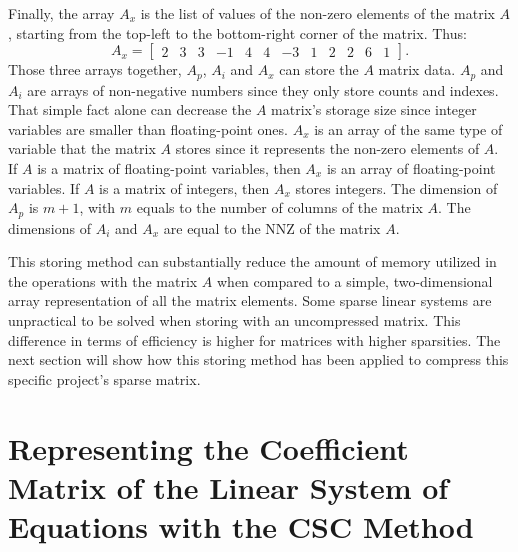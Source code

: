 Finally, the array $A_x$ is the list of values of the non-zero elements of the matrix $A$, starting from the top-left to the bottom-right corner of the matrix. Thus: 
	\begin{equation}
	A_x = 
	\begin{bmatrix}
	2	&3	&3	&-1	&4	&4	&-3	&1	&2	&2	&6	&1
	\end{bmatrix}
	.
	\end{equation}
%
Those three arrays together, $A_p$, $A_i$ and $A_x$ can store the $A$ matrix data. 
%
$A_p$ and $A_i$ are arrays of non-negative numbers since they only store counts and indexes. 
%
That simple fact alone can decrease the $A$ matrix's storage size since integer variables are smaller than floating-point ones. 
%
$A_x$ is an array of the same type of variable that the matrix $A$ stores since it represents the non-zero elements of $A$. 
%
If $A$ is a matrix of floating-point variables, then $A_x$ is an array of floating-point variables. 
%
If $A$ is a matrix of integers, then $A_x$ stores integers. 
%
The dimension of $A_p$ is $m+1$, with $m$ equals to the number of columns of the matrix $A$. 
%
The dimensions of $A_i$ and $A_x$ are equal to the NNZ of the matrix $A$. 

This storing method can substantially reduce the amount of memory utilized in the operations with the matrix $A$ when compared to a simple, two-dimensional array representation of all the matrix elements. 
%
Some sparse linear systems are unpractical to be solved when storing with an uncompressed matrix. 
%
This difference in terms of efficiency is higher for matrices with higher sparsities. 
%
The next section will show how this storing method has been applied to compress this specific project's sparse matrix.

\section{Representing the Coefficient Matrix of the Linear System of Equations with the CSC Method}

